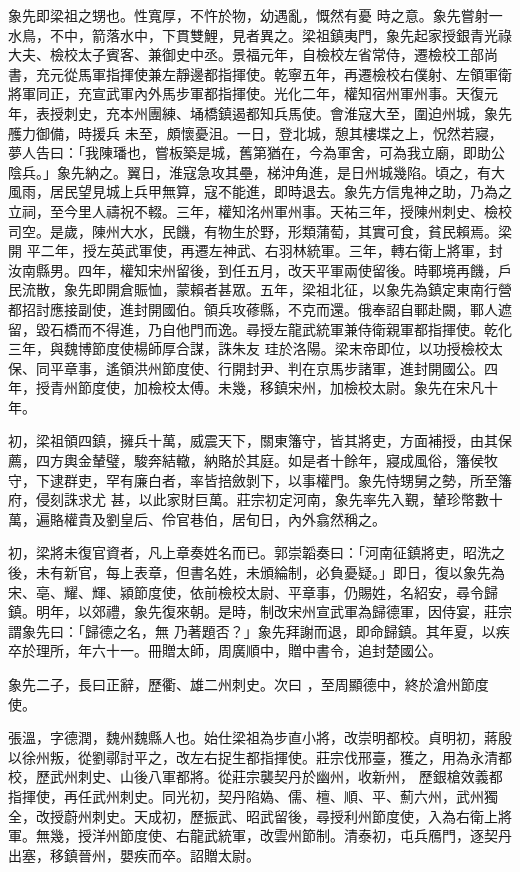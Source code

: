 \begin{pinyinscope}
 象先即梁祖之甥也。性寬厚，不忤於物，幼遇亂，慨然有憂
 時之意。象先嘗射一水鳥，不中，箭落水中，下貫雙鯉，見者異之。梁祖鎮夷門，象先起家授銀青光祿大夫、檢校太子賓客、兼御史中丞。景福元年，自檢校左省常侍，遷檢校工部尚書，充元從馬軍指揮使兼左靜邊都指揮使。乾寧五年，再遷檢校右僕射、左領軍衛將軍同正，充宣武軍內外馬步軍都指揮使。光化二年，權知宿州軍州事。天復元年，表授刺史，充本州團練、埇橋鎮遏都知兵馬使。會淮寇大至，圍迫州城，象先雘力御備，時援兵
 未至，頗懷憂沮。一日，登北城，憩其樓堞之上，怳然若寢，夢人告曰：「我陳璠也，嘗板築是城，舊第猶在，今為軍舍，可為我立廟，即助公陰兵。」象先納之。翼日，淮寇急攻其壘，梯沖角進，是日州城幾陷。頃之，有大風雨，居民望見城上兵甲無算，寇不能進，即時退去。象先方信鬼神之助，乃為之立祠，至今里人禱祝不輟。三年，權知洺州軍州事。天祐三年，授陳州刺史、檢校司空。是歲，陳州大水，民饑，有物生於野，形類蒲萄，其實可食，貧民賴焉。梁開
 平二年，授左英武軍使，再遷左神武、右羽林統軍。三年，轉右衛上將軍，封汝南縣男。四年，權知宋州留後，到任五月，改天平軍兩使留後。時鄆境再饑，戶民流散，象先即開倉賑恤，蒙賴者甚眾。五年，梁祖北征，以象先為鎮定東南行營都招討應接副使，進封開國伯。領兵攻蓚縣，不克而還。俄奉詔自鄆赴闕，鄆人遮留，毀石橋而不得進，乃自他門而逸。尋授左龍武統軍兼侍衛親軍都指揮使。乾化三年，與魏博節度使楊師厚合謀，誅朱友
 珪於洛陽。梁末帝即位，以功授檢校太保、同平章事，遙領洪州節度使、行開封尹、判在京馬步諸軍，進封開國公。四年，授青州節度使，加檢校太傅。未幾，移鎮宋州，加檢校太尉。象先在宋凡十年。



 初，梁祖領四鎮，擁兵十萬，威震天下，關東籓守，皆其將吏，方面補授，由其保薦，四方輿金輦璧，駿奔結轍，納賂於其庭。如是者十餘年，寢成風俗，籓侯牧守，下逮群吏，罕有廉白者，率皆掊斂剝下，以事權門。象先恃甥舅之勢，所至籓府，侵刻誅求尤
 甚，以此家財巨萬。莊宗初定河南，象先率先入覲，輦珍幣數十萬，遍賂權貴及劉皇后、伶官巷伯，居旬日，內外翕然稱之。



 初，梁將未復官資者，凡上章奏姓名而已。郭崇韜奏曰：「河南征鎮將吏，昭洗之後，未有新官，每上表章，但書名姓，未頒綸制，必負憂疑。」即日，復以象先為宋、亳、耀、輝、潁節度使，依前檢校太尉、平章事，仍賜姓，名紹安，尋令歸鎮。明年，以郊禮，象先復來朝。是時，制改宋州宣武軍為歸德軍，因侍宴，莊宗謂象先曰：「歸德之名，無
 乃著題否？」象先拜謝而退，即命歸鎮。其年夏，以疾卒於理所，年六十一。冊贈太師，周廣順中，贈中書令，追封楚國公。


象先二子，長曰正辭，歷衢、雄二州刺史。次曰
 ，至周顯德中，終於滄州節度使。



 張溫，字德潤，魏州魏縣人也。始仕梁祖為步直小將，改崇明都校。貞明初，蔣殷以徐州叛，從劉鄩討平之，改左右捉生都指揮使。莊宗伐邢臺，獲之，用為永清都校，歷武州刺史、山後八軍都將。從莊宗襲契丹於幽州，收新州，
 歷銀槍效義都指揮使，再任武州刺史。同光初，契丹陷媯、儒、檀、順、平、薊六州，武州獨全，改授蔚州刺史。天成初，歷振武、昭武留後，尋授利州節度使，入為右衛上將軍。無幾，授洋州節度使、右龍武統軍，改雲州節制。清泰初，屯兵鴈門，逐契丹出塞，移鎮晉州，嬰疾而卒。詔贈太尉。




\end{pinyinscope}
